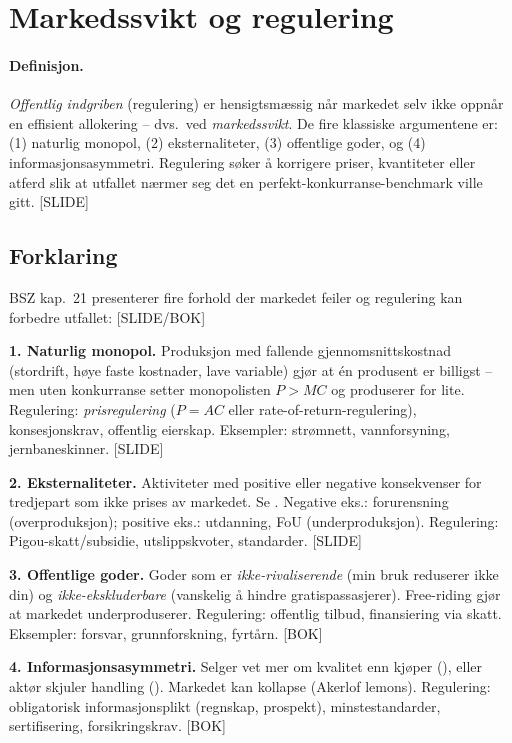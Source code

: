 \section{Markedssvikt og regulering}\label{thr:market-failure-regulation}

\paragraph{Definisjon.} \emph{Offentlig indgriben} (regulering) er hensigtsmæssig når markedet selv ikke oppnår en effisient allokering -- dvs.\ ved \emph{markedssvikt}. De fire klassiske argumentene er: (1) naturlig monopol, (2) eksternaliteter, (3) offentlige goder, og (4) informasjonsasymmetri. Regulering søker å korrigere priser, kvantiteter eller atferd slik at utfallet nærmer seg det en perfekt-konkurranse-benchmark ville gitt. [SLIDE]

\subsection*{Forklaring}

BSZ kap.\ 21 presenterer fire forhold der markedet feiler og regulering kan forbedre utfallet: [SLIDE/BOK]

\textbf{1. Naturlig monopol.} Produksjon med fallende gjennomsnittskostnad (stordrift, høye faste kostnader, lave variable) gjør at én produsent er billigst -- men uten konkurranse setter monopolisten $P>MC$ og produserer for lite. Regulering: \emph{prisregulering} ($P=AC$ eller rate-of-return-regulering), konsesjonskrav, offentlig eierskap. Eksempler: strømnett, vannforsyning, jernbaneskinner. [SLIDE]

\textbf{2. Eksternaliteter.} Aktiviteter med positive eller negative konsekvenser for tredjepart som ikke prises av markedet. Se . Negative eks.: forurensning (overproduksjon); positive eks.: utdanning, FoU (underproduksjon). Regulering: Pigou-skatt/subsidie, utslippskvoter, standarder. [SLIDE]

\textbf{3. Offentlige goder.} Goder som er \emph{ikke-rivaliserende} (min bruk reduserer ikke din) og \emph{ikke-ekskluderbare} (vanskelig å hindre gratispassasjerer). Free-riding gjør at markedet underproduserer. Regulering: offentlig tilbud, finansiering via skatt. Eksempler: forsvar, grunnforskning, fyrtårn. [BOK]

\textbf{4. Informasjonsasymmetri.} Selger vet mer om kvalitet enn kjøper (), eller aktør skjuler handling (). Markedet kan kollapse (Akerlof lemons). Regulering: obligatorisk informasjonsplikt (regnskap, prospekt), minstestandarder, sertifisering, forsikringskrav. [BOK]

